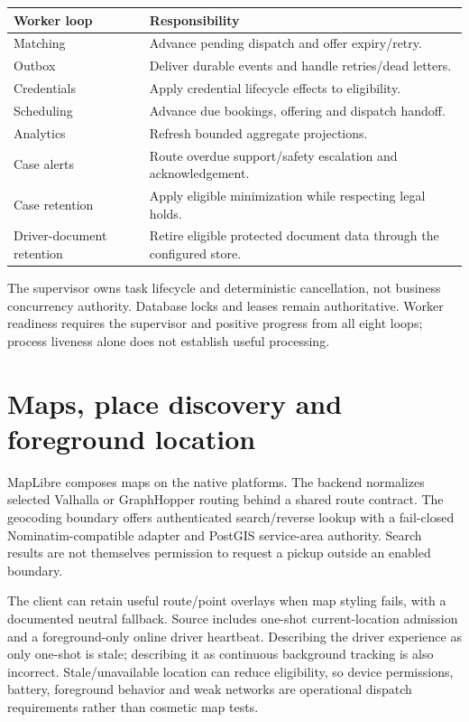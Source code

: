 \documentclass[11pt,a4paper]{article}
\begin{document}
\begin{table}[H]\centering
\begin{tabular}{@{}p{}p{}@{}}
\toprule Worker loop & Responsibility \\\midrule
Matching & Advance pending dispatch and offer expiry/retry. \\
Outbox & Deliver durable events and handle retries/dead letters. \\
Credentials & Apply credential lifecycle effects to eligibility. \\
Scheduling & Advance due bookings, offering and dispatch handoff. \\
Analytics & Refresh bounded aggregate projections. \\
Case alerts & Route overdue support/safety escalation and acknowledgement. \\
Case retention & Apply eligible minimization while respecting legal holds. \\
Driver-document retention & Retire eligible protected document data through the configured store. \\
\bottomrule
\end{tabular}
\end{table}
The supervisor owns task lifecycle and deterministic cancellation, not business
concurrency authority. Database locks and leases remain authoritative. Worker
readiness requires the supervisor and positive progress from all eight loops;
process liveness alone does not establish useful processing.

\section{Maps, place discovery and foreground location}
MapLibre composes maps on the native platforms. The backend normalizes selected
Valhalla or GraphHopper routing behind a shared route contract. The geocoding
boundary offers authenticated search/reverse lookup with a fail-closed
Nominatim-compatible adapter and PostGIS service-area authority. Search results
are not themselves permission to request a pickup outside an enabled boundary.

The client can retain useful route/point overlays when map styling fails, with a
documented neutral fallback. Source includes one-shot current-location admission
and a foreground-only online driver heartbeat. Describing the driver experience
as only one-shot is stale; describing it as continuous background tracking is
also incorrect. Stale/unavailable location can reduce eligibility, so device
permissions, battery, foreground behavior and weak networks are operational
dispatch requirements rather than cosmetic map tests.
\end{document}
